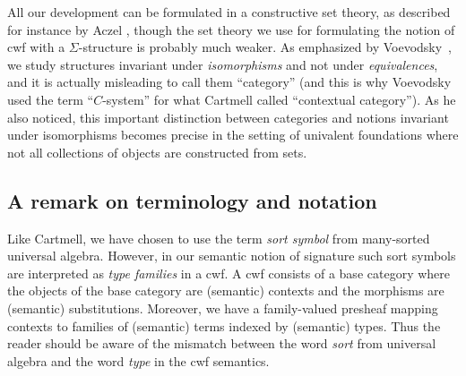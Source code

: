 \documentclass{lmcs}
\begin{document}
All our development can be formulated in a constructive set theory,
as described for instance by Aczel \cite{MR519801}, though the set theory
we use for formulating the notion of cwf with a $\Sigma$-structure is probably
much weaker. As emphasized by Voevodsky~\cite{voevodsky:initiality}, we study structures invariant
under {\em isomorphisms} and not under {\em equivalences}, and it is actually misleading
to call them ``category'' (and this is why Voevodsky used the term ``$C$-system''
for what Cartmell called ``contextual category'').
As he also noticed, this
important distinction between categories and notions invariant under isomorphisms becomes
precise in the setting of univalent foundations where not all collections of objects
are constructed from sets.


\subsection*{A remark on terminology and notation}
Like Cartmell, we have chosen to use the term {\em sort symbol} from many-sorted universal algebra. However, in our semantic notion of signature such sort symbols are interpreted as {\em type families} in a cwf. A cwf consists of a base category where the objects of the base category are (semantic) contexts and the morphisms are (semantic) substitutions. Moreover, we have a family-valued presheaf mapping contexts to families of (semantic) terms indexed by (semantic) types. Thus the reader should be aware of the mismatch between the word {\em sort} from universal algebra and the word {\em type} in the cwf semantics.
\end{document}
